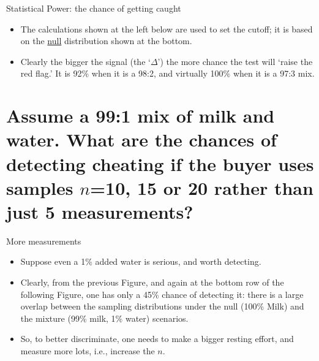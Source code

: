\documentclass{beamer}\usepackage[]{graphicx}\usepackage[]{color}
\begin{document}
\begin{frame}{Statistical Power: the chance of getting caught}
\begin{itemize}
		\setlength\itemsep{1em}
	\item The calculations shown at the left below are used to set  the cutoff;
it is based on the \underline{null} distribution shown at the bottom. 
\item Clearly the bigger the signal (the `$\Delta$') the more chance the test will `raise the red flag.' It is 92\% when it is a 98:2, and virtually 100\% when it is a 97:3 mix.
\end{itemize}


\end{frame}


\section{Assume a 99:1 mix of milk and water. What are the chances of detecting cheating if the buyer uses samples $n$=10, 15 or 20 rather than just 5 measurements?}

\begin{frame}{More measurements}

\begin{itemize}
	\item Suppose even a 1\% added water is serious, and worth detecting.
\item Clearly, from the previous Figure, and again at the bottom row of the following Figure,
one has only a 45\% chance of detecting it: there is a large overlap between the sampling distributions under the null (100\% Milk) and the mixture (99\% milk, 1\% water) scenarios.

\item So, to better discriminate, one needs to make a bigger resting effort, and measure more lots,
i.e., increase the $n$.
\end{itemize}
\end{frame}
\end{document}
